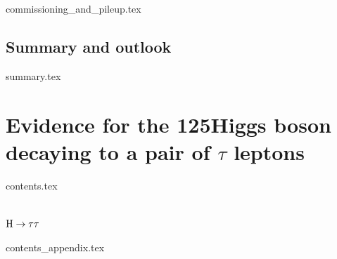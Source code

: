 \documentclass[11pt,twoside,a4paper,tdr]{cms-tdr}
\begin{document}
{commissioning_and_pileup.tex}

\clearpage

\section{Summary and outlook}
\label{sec:summary}

{summary.tex}




\chapter{Evidence for the 125\GeV Higgs boson decaying to a pair of $\tau$ leptons}

\pagebreak 

{contents.tex}

\pagebreak 



\pagebreak

\appendix

\chapter[H to tau tau]{$\mathrm{H} \to \tau \tau$}

\pagebreak

{contents_appendix.tex}

 


\pagebreak


\end{document}
